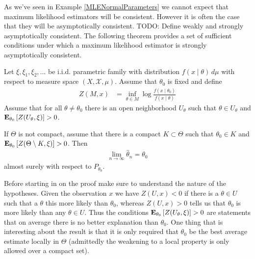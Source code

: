 As we've seen in Example \ref{MLENormalParameters} we cannot expect
that maximum likelihood estimators will be consistent.  However it is
often the case that they will be asymptotically consistent.  
TODO: Define weakly and strongly asymptotically consistent.
The following theorem provides a set of sufficient conditions under
which a maximum likelihood estimator is strongly asymptotically consistent.
\begin{thm}\label{AsymptoticConsistencyMLE}Let $\xi, \xi_1, \xi_2, \dots$ be i.i.d. parametric
  family with distribution $f(x \mid \theta) \, d \mu$ with respect to measure
  space $(X, \mathcal{X}, \mu)$.  Assume that  $\theta_0$ is fixed and
  define 
\begin{align*}
Z(M, x) &= \inf_{\theta \in M} \log \frac{f(x \mid \theta_0)}{f(x \mid \theta)}
\end{align*}
Assume that for all $\theta \neq \theta_0$ there is an open neighborhood $U_\theta$
such that $\theta \in U_\theta$ and $\sexpectation{Z(U_\theta, \xi)}{\theta_0} >
0$.

If $\Theta$ is not compact, assume that there is a compact $K \subset
\Theta$ such that $\theta_0 \in K$ and $\sexpectation{Z(\Theta
  \setminus K, \xi)}{\theta_0} > 0$.  Then 
\begin{align*}
\lim_{n \to \infty} \hat{\theta}_n = \theta_0
\end{align*}
almost surely with respect to $P_{\theta_0}$.
\end{thm}

Before starting in on the proof make sure to understand the nature of
the hypotheses.  Given the observation $x$ we have $Z(U, x) < 0$ if
there is a $\theta \in U$ such that a $\theta$ this more likely than
$\theta_0$, whereas $Z(U, x) > 0$ tells us that $\theta_0$ is more
likely than any $\theta \in U$.  Thus the conditions $\sexpectation{Z(U_\theta, \xi)}{\theta_0} >
0$ are statements that on average there is no better explanation than
$\theta_0$.  One thing that is interesting about the result is that it
is only required that $\theta_0$ be the best average estimate locally
in $\Theta$ (admittedly the weakening to a local property is only
allowed over a compact set).


